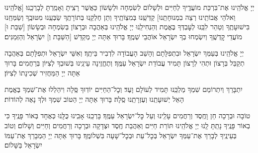 \documentclass[twoside, openany, parskip=half, 11pt]{book}
\begin{document}
יְיָ אֱלֹהֵֽינוּ אֶת־בִּרְכַּת מוֹעֲדֶֽיךָ לְחַיִּים וּלְשָׁלוֹם לְשִׂמְחָה וּלְשָׂשׂוֹן כַּאֲשֶׁר רָצִֽיתָ וְאָמַֽרְתָּ לְבָרְכֵֽנוּ׃ [\shabbos אֱלֹהֵֽינוּ וֵאלֹהֵי אֲבוֹתֵֽינוּ רְצֵה בִמְנוּחָתֵֽנוּ] קַדְּשֵֽׁנוּ בְּמִצְוֹתֶֽיךָ וְתֵן חֶלְקֵֽנוּ בְּתוֹרָתֶֽךָ שַׂבְּעֵֽנוּ מִטּוּבֶֽךָ וְשַׂמְּחֵֽנוּ בִּישׁוּעָתֶֽךָ וְטַהֵר לִבֵּֽנוּ לְעׇבְדְּךָ בֶּאֱמֶת וְהַנְחִילֵֽנוּ יְיָ אֱלֹהֵֽינוּ בְּאַהֲבָה וּבְרָצוֹן בְּשִׂמְחָה וּבְשָׂשׂוֹן [\shabbos שַׁבַּת וּ] מוֹעֲדֵי קׇדְשֶֽׁךָ וְיִשְׂמְחוּ בְךָ יִשְׂרָאֵל אוֹהֲבֵי שְׁמֶֽךָ׃ בָּרוּךְ אַתָּה יְיָ מְקַדֵּשׁ
[\shabbos הַשַּׁבָּת וְ] יִשְׂרָאֵל וְהַזְּמַנִּים׃


יְיָ אֱלֹהֵֽינוּ בְּעַמְּךָ יִשְׂרָאֵל וּבִתְפִלָּתָם וְהָשֵׁב הָעֲבוֹדָה לִדְבִיר בֵּיתֶֽךָ׃ וְאִשֵּׁי יִשְׂרָאֵל וּתְפִלָּתָם בְּאַהֲבָה תְקַבֵּל בְּרָצוֹן וּתְהִי לְרָצוֹן תָּמִיד עֲבוֹדַת יִשְׂרָאֵל עַמֶּֽךָ׃ וְתֶחֱזֶֽינָה עֵינֵֽינוּ בְּשׁוּבְךָ לְצִיּוֹן בְּרַחֲמִים׃ בָּרוּךְ אַתָּה יְיָ הַמַּחֲזִיר שְׁכִינָתוֹ לְצִיּוֹן׃

\modim

יִתְבָּרַךְ וְיִתְרוֹמַם שִׁמְךָ מַלְכֵּֽנוּ תָּמִיד לְעוֹלָם וָעֶד׃ וְכׇל־הַחַיִּים יוֹדֽוּךָ סֶּֽלָה וִיהַלְלוּ אֶת־שִׁמְךָ בֶּאֱמֶת הָאֵל יְשׁוּעָתֵֽנוּ וְעֶזְרָתֵֽנוּ סֶֽלָה׃ בָּרוּךְ אַתָּה יְיָ הַטּוֹב שִׁמְךָ וּלְךָ נָאֶה לְהוֹדוֹת׃



טוֹבָה וּבְרָכָה חֵן וָחֶֽסֶד וְרַחֲמִים עָלֵֽינוּ וְעַל כׇּל־יִשְׂרָאֵל עַמֶּֽךָ׃ בָּרְכֵֽנוּ אָבִֽינוּ כֻּלָּֽנוּ כְּאֶחָד בְּאוֹר פָּנֶֽיךָ כִּי בְאוֹר פָּנֶֽיךָ נָתַֽתָּ לָֽנוּ יְיָ אֱלֹהֵֽינוּ תּוֹרַת חַיִּים וְאַהֲבַת חֶֽסֶד וּצְדָקָה וּבְרָכָה וְרַחֲמִים וְחַיִּים וְשָׁלוֹם׃ וְטוֹב בְּעֵינֶֽיךָ לְבָרֵךְ אֶת־עַמְּךָ יִשְׂרָאֵל בְּכׇל־עֵת וּבְכׇל־שָׁעָה בִּשְׁלוֹמֶֽךָ׃ בָּרוּךְ אַתָּה יְיָ הַמְבָרֵךְ אֶת־עַמּוֹ יִשְׂרָאֵל בַּשָּׁלוֹם׃

\tachanunim

\vfill


\\

\sepline

\\
\\
\end{document}
